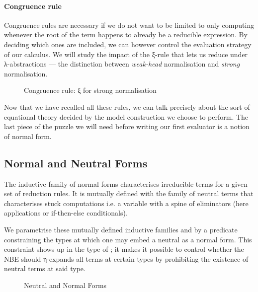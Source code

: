 \paragraph{Congruence rule} Congruence rules are necessary if we do not
want to be limited to only computing whenever the root of the term happens
to already be a reducible expression. By deciding which ones are included,
we can however control the evaluation strategy of our calculus. We will
study the impact of the ξ-rule that lets us reduce under λ-abstractions --- the
distinction between \emph{weak-head} normalisation and \emph{strong}
normalisation.

\begin{figure}[h]
\begin{mathpar}
\end{mathpar}
\caption{Congruence rule: ξ for strong normalisation\label{fig:xirules}}
\end{figure}

Now that we have recalled all these rules, we can talk precisely about the
sort of equational theory decided by the model construction we choose to
perform. The last piece of the puzzle we will need before writing our first
evaluator is a notion of normal form.

\subsection{Normal and Neutral Forms}

The inductive family of normal forms characterises irreducible terms for a
given set of reduction rules. It is mutually defined with the family of
neutral terms that characterises stuck computations i.e. a variable with
a spine of eliminators (here applications or if-then-else conditionals).

We parametrise these mutually defined inductive families  and 
by a predicate  constraining the types at which one may embed a neutral
as a normal form. This constraint shows up in the type of ; it makes
it possible to control whether the NBE should η-expands all terms at certain
types by prohibiting the existence of neutral terms at said type.

\begin{figure}[h]
\caption{Neutral and Normal Forms}
\end{figure}

